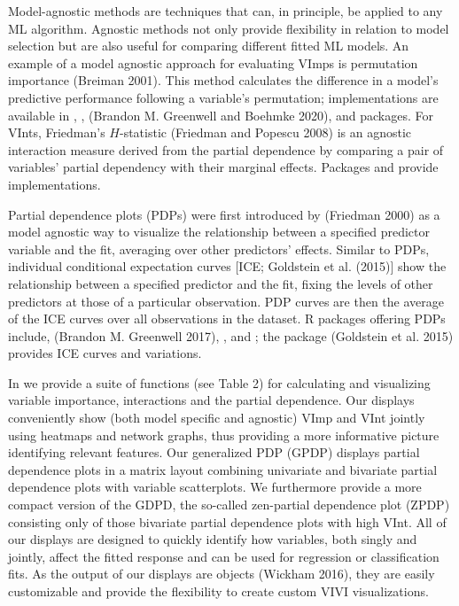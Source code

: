 Model-agnostic methods are techniques that can, in principle, be applied
to any ML algorithm. Agnostic methods not only provide flexibility in
relation to model selection but are also useful for comparing different
fitted ML models. An example of a model agnostic approach for evaluating
VImps is permutation importance (Breiman 2001). This method
calculates the difference in a model's predictive performance following
a variable's permutation; implementations are available in ,
,  (Brandon M. Greenwell and Boehmke 2020),
and  packages. For VInts, Friedman's \(H\)-statistic (Friedman and Popescu 2008) is an
agnostic interaction measure derived from the partial dependence by
comparing a pair of variables' partial dependency with their marginal
effects. Packages  and  provide implementations.

Partial dependence plots (PDPs) were first introduced by (Friedman 2000) as
a model agnostic way to visualize the relationship between a specified
predictor variable and the fit, averaging over other predictors'
effects. Similar to PDPs, individual conditional expectation curves
{[}ICE; Goldstein et al. (2015){]} show the relationship between a specified predictor and the
fit, fixing the levels of other predictors at those of a particular
observation. PDP curves are then the average of the ICE curves over all
observations in the dataset. R packages offering PDPs include,  (Brandon M. Greenwell 2017),
, and ; the package  (Goldstein et al. 2015) provides ICE curves and variations.

In  we provide a suite of functions (see Table 2) for calculating and visualizing variable importance, interactions and the partial dependence. Our displays conveniently show
(both model specific and agnostic) VImp and VInt jointly using heatmaps and network graphs, thus providing a more informative picture identifying relevant features. Our generalized PDP (GPDP) displays partial dependence plots in a matrix layout combining univariate and bivariate partial dependence plots with variable scatterplots. We furthermore provide a more compact version of the GDPD, the so-called zen-partial dependence plot (ZPDP) consisting only of those bivariate partial dependence plots with high VInt. All of our displays are designed to quickly identify how variables, both singly and jointly, affect the fitted response and can be used for regression or classification fits. As the output of our displays are  objects (Wickham 2016), they are easily customizable and provide the flexibility to create custom VIVI visualizations.

